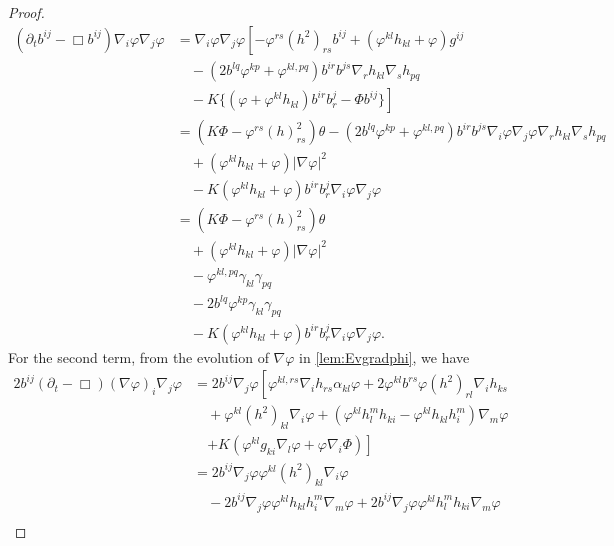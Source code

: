 \documentclass{amsart}
\begin{document}
\begin{proof}
\begin{equation}
\begin{split}
(\partial_{t}b^{ij} - \Box b^{ij})\nabla_i \varphi\nabla_j\varphi &= \nabla_i \varphi \nabla_j \varphi\left[-\varphi^{rs} (h^2)_{rs} b^{ij} + (\varphi^{kl}h_{kl} + \varphi) g^{ij} \right. \\
& \quad - \left(2b^{lq}\varphi^{kp} + \varphi^{kl,pq}\right) b^{ir}b^{js} \nabla_r h_{kl} \nabla_s h_{pq} \\
& \quad - \left. K \{(\varphi + \varphi^{kl}h_{kl}) b^{ir}b^{j}_{r} - \Phi b^{ij}\}\right] \\
&= \left(K\Phi - \varphi^{rs}(h)^2_{rs}\right) \theta - (2b^{lq}\varphi^{kp} + \varphi^{kl,pq}) b^{ir}b^{js}\nabla_i\varphi\nabla_j\varphi\nabla_rh_{kl}\nabla_s h_{pq} \\
&\quad + (\varphi^{kl}h_{kl} + \varphi)|\nabla\varphi|^{2} \\
&\quad - K(\varphi^{kl}h_{kl} + \varphi)b^{ir}b^{j}_{r}\nabla_i \varphi\nabla_j\varphi \\
&= \left(K\Phi - \varphi^{rs}(h)^2_{rs}\right) \theta \\
&\quad + (\varphi^{kl}h_{kl} + \varphi)|\nabla\varphi|^{2} \\
&\quad - \varphi^{kl,pq} \gamma_{kl} \gamma_{pq} \\
&\quad - 2b^{lq}\varphi^{kp} \gamma_{kl} \gamma_{pq} \\
&\quad - K(\varphi^{kl}h_{kl} + \varphi)b^{ir}b^{j}_{r}\nabla_i \varphi\nabla_j\varphi.
\end{split}
\end{equation}
For the second term, from the evolution of \(\nabla\varphi\) in \cref{lem:Evgradphi}, we have
\begin{equation}
\label{eq:delt_theta2}
\begin{split}
2 b^{ij} (\partial_{t} - \Box) (\nabla\varphi)_i \nabla_j\varphi &= 2 b^{ij} \nabla_j\varphi \left[\varphi^{kl,rs}\nabla_i h_{rs} \alpha_{kl}\varphi + 2 \varphi^{kl} b^{rs} \varphi(h^2)_{rl} \nabla_i h_{ks} \right. \\
&\quad + \varphi^{kl}(h^2)_{kl}\nabla_i \varphi + \left(\varphi^{kl}h^{m}_{l}h_{ki} - \varphi^{kl}h_{kl}h^{m}_{i}\right) \nabla_m \varphi\\
&\quad \left. + K\left(\varphi^{kl}g_{ki} \nabla_l \varphi + \varphi \nabla_i \Phi\right)\right] \\
&= 2 b^{ij} \nabla_j\varphi \varphi^{kl}(h^2)_{kl}\nabla_i \varphi \\
&\quad - 2 b^{ij} \nabla_j\varphi \varphi^{kl}h_{kl}h^{m}_{i} \nabla_m \varphi + 2 b^{ij} \nabla_j\varphi \varphi^{kl}h^{m}_{l}h_{ki} \nabla_m \varphi \\

\end{split}
\end{equation}
\end{proof}
\end{document}
